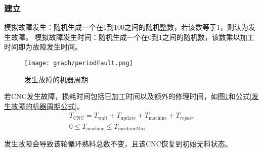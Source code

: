 		\subsubsection{建立}
			模拟故障发生：随机生成一个在1到100之间的随机整数，若该数等于1，则认为发生故障。
			模拟故障发生时间：随机生成一个在0到1之间的随机数，该数乘以加工时间即为故障发生时间。
			\begin{figure}[htbp]
				\centering
				\caption{发生故障的机器周期}
				\label{发生故障的机器周期}
				\texttt{[image: graph/periodFault.png]}
			\end{figure}
			\par\indent 若CNC发生故障，损耗时间包括已加工时间以及额外的修理时间，如图\ref{发生故障的机器周期}和公式\ref{发生故障的机器周期公式}。
			\begin{align}
				\label{发生故障的机器周期公式}
				T_\mathrm{CNC}=T_\mathrm{wait}+T_\mathrm{update}+T_\mathrm{machine}+T_{repair} \\
				0\leqslant T_\mathrm{machine}\leqslant T_\mathrm{machineMax}
			\end{align}
			\par\indent 发生故障会导致该轮循环熟料总数不变，且该CNC恢复到初始无料状态。

